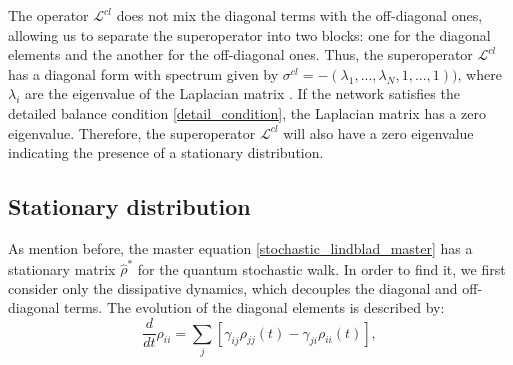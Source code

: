The operator $\mathcal{L}^{cl}$ does not mix the diagonal terms with the off-diagonal ones, allowing us to separate the superoperator into two blocks: one for the diagonal elements and the another for the off-diagonal ones.
Thus, the superoperator $\mathcal{L}^{cl}$ has a diagonal form with spectrum given by $\sigma^{cl} = -(\lambda_1,...,\lambda_N,1,...,1))$, where $\lambda_i$ are the eigenvalue of the Laplacian matrix \cite{Bruderer_Plenio}.
If the network satisfies the detailed balance condition \eqref{detail_condition}, the Laplacian matrix has a zero eigenvalue. Therefore, the superoperator $\mathcal{L}^{cl}$ will also have a zero eigenvalue indicating the presence of a stationary distribution.

\begin{comment}
    \begin{equation}
    \begin{split}
    \mathcal{L}^{qm}\ket{k}\bra{l} =& -i\hat L\ket{k}\bra{l} + i \ket{k}\bra{l}\hat L\\
    &=\frac{i}{2}\sum_{ij} - L_{ij}\ket{i}\braket{j}{k}\bra{l} + \ket{k}\braket{l}{i}\bra{j}\\
    &=\frac{1}{2}\sum_i -L_{ik} \ket{i}\bra{l} + \sum_i L_{li}\ket{k}\bra{i}\\
\end{split}
\end{equation}

Instead the diagonal terms
\begin{equation}
\begin{split}
\mathcal{L}^{qm}\ket{l}\bra{l} =& -i\hat L\ket{l}\bra{l} + i \ket{l}\bra{l}\hat L\\
&=\frac{i}{2}\sum_{ij} - L_{ij}\ket{i}\braket{j}{l}\bra{l} + \ket{l}\braket{l}{i}\bra{j}\\
&=\frac{1}{2}\sum_i -L_{il} \ket{i}\bra{l} + \sum_i L_{li}\ket{l}\bra{i} = 0\\
\end{split}
\end{equation}
\end{comment}

\subsection{Stationary distribution}

As mention before, the master equation \eqref{stochastic_lindblad_master} has a stationary matrix $\hat\rho^*$ for the quantum stochastic walk.
In order to find it, we first consider only the dissipative dynamics, which decouples the diagonal and off-diagonal terms. The evolution of the diagonal elements is described by:
\begin{equation}
    \frac{d}{dt}\rho_{ii} = \sum_j\left[\gamma_{ij}\rho_{jj}(t) - \gamma_{ji}\rho_{ii}(t)\right],
\end{equation}


